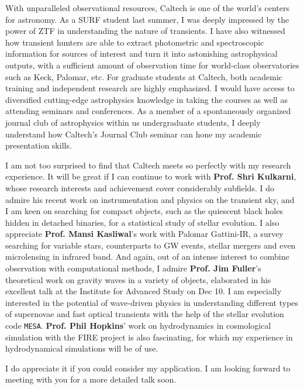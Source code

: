 \documentclass[11pt, a4paper]{awesome-cv} %
\begin{document}
\makecvheader %



\begin{cvletter}




With unparalleled observational resources, Caltech is one of the world’s centers for astronomy. As a SURF student last summer, I was deeply impressed by the power of ZTF in understanding the nature of transients. I have also witnessed how transient hunters are able to extract photometric and spectroscopic information for sources of interest and turn it into astonishing astrophysical outputs, with a sufficient amount of observation time for world-class observatories such as Keck, Palomar, etc. For graduate students at Caltech, both academic training and independent research are highly emphasized. I would have access to diversified cutting-edge astrophysics knowledge in taking the courses as well as attending seminars and conferences. As a member of a spontaneously organized journal club of astrophysics within us undergraduate students, I deeply understand how Caltech's Journal Club seminar can hone my academic presentation skills.

I am not too surprised to find that Caltech meets so perfectly with my research experience. It will be great if I can continue to work with \textbf{Prof. Shri Kulkarni}, whose research interests and achievement cover considerably subfields. I do admire his recent work on instrumentation and physics on the transient sky, and I am keen on searching for compact objects, such as the quiescent black holes hidden in detached binaries, for a statistical study of stellar evolution. I also appreciate \textbf{Prof. Mansi Kasliwal}’s work with Palomar Gattini-IR, a survey searching for variable stars, counterparts to GW events, stellar mergers and even microlensing in infrared band. And again, out of an intense interest to combine observation with computational methods, I admire \textbf{Prof. Jim Fuller}’s theoretical work on gravity waves in a variety of objects, elaborated in his excellent talk at the Institute for Advanced Study on Dec 10. I am especially interested in the potential of wave-driven physics in understanding different types of supernovae and fast optical transients with the help of the stellar evolution code \texttt{MESA}. \textbf{Prof. Phil Hopkins}’ work on hydrodynamics in cosmological simulation with the FIRE project is also fascinating, for which my experience in hydrodynamical simulations will be of use.


I do appreciate it if you could consider my application. I am looking forward to meeting with you for a more detailed talk soon.

\end{cvletter}


\end{document}
